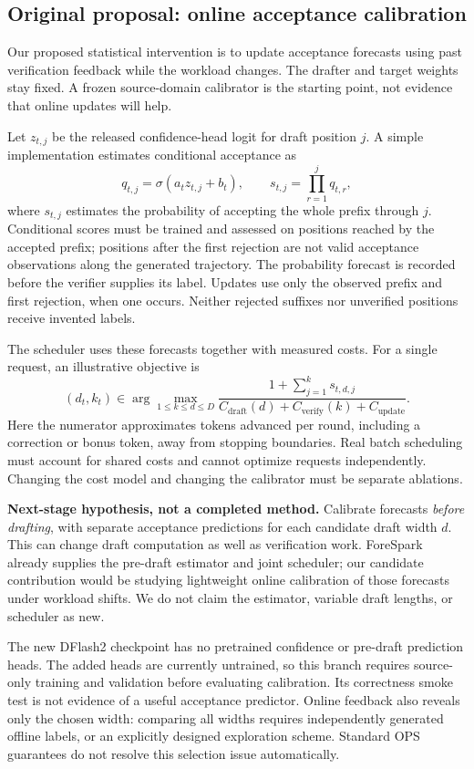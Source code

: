 \documentclass[10pt]{article}
\begin{document}
\subsection{Original proposal: online acceptance calibration}
Our proposed statistical intervention is to update acceptance forecasts using past verification feedback while the workload changes. The drafter and target weights stay fixed. A frozen source-domain calibrator is the starting point, not evidence that online updates will help.

Let $z_{t,j}$ be the released confidence-head logit for draft position $j$. A simple implementation estimates conditional acceptance as
\[
 q_{t,j}=\sigma(a_t z_{t,j}+b_t),\qquad
 s_{t,j}=\prod_{r=1}^{j}q_{t,r},
\]
where $s_{t,j}$ estimates the probability of accepting the whole prefix through $j$. Conditional scores must be trained and assessed on positions reached by the accepted prefix; positions after the first rejection are not valid acceptance observations along the generated trajectory. The probability forecast is recorded before the verifier supplies its label. Updates use only the observed prefix and first rejection, when one occurs. Neither rejected suffixes nor unverified positions receive invented labels.

The scheduler uses these forecasts together with measured costs. For a single request, an illustrative objective is
\[
 (d_t,k_t)\in\arg\max_{1\leq k\leq d\leq D}
 \frac{1+\sum_{j=1}^{k}s_{t,d,j}}
 {C_{\mathrm{draft}}(d)+C_{\mathrm{verify}}(k)+C_{\mathrm{update}}}.
\]
Here the numerator approximates tokens advanced per round, including a correction or bonus token, away from stopping boundaries. Real batch scheduling must account for shared costs and cannot optimize requests independently. Changing the cost model and changing the calibrator must be separate ablations.

\textbf{Next-stage hypothesis, not a completed method.} Calibrate forecasts \emph{before drafting}, with separate acceptance predictions for each candidate draft width $d$. This can change draft computation as well as verification work. ForeSpark already supplies the pre-draft estimator and joint scheduler; our candidate contribution would be studying lightweight online calibration of those forecasts under workload shifts. We do not claim the estimator, variable draft lengths, or scheduler as new.

The new DFlash2 checkpoint has no pretrained confidence or pre-draft prediction heads. The added heads are currently untrained, so this branch requires source-only training and validation before evaluating calibration. Its correctness smoke test is not evidence of a useful acceptance predictor. Online feedback also reveals only the chosen width: comparing all widths requires independently generated offline labels, or an explicitly designed exploration scheme. Standard OPS guarantees do not resolve this selection issue automatically.
\end{document}
